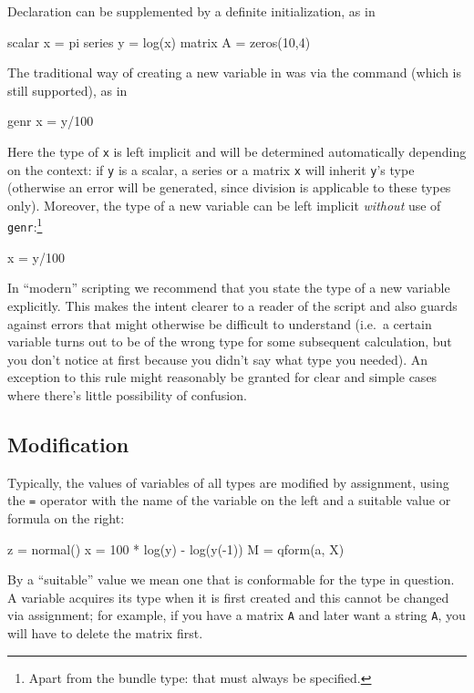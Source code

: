 Declaration can be supplemented by a definite initialization, as in

\begin{code}
scalar x = pi
series y = log(x)
matrix A = zeros(10,4)
\end{code}

The traditional way of creating a new variable in  was via
the  command (which is still supported), as in

\begin{code}
genr x = y/100
\end{code}

Here the type of \texttt{x} is left implicit and will be determined
automatically depending on the context: if \texttt{y} is a scalar, a
series or a matrix \texttt{x} will inherit \texttt{y}'s type
(otherwise an error will be generated, since division is applicable to
these types only). Moreover, the type of a new variable can be left
implicit \textit{without} use of \texttt{genr}:\footnote{Apart from
  the bundle type: that must always be specified.}

\begin{code}
x = y/100
\end{code}

In ``modern''  scripting we recommend that you state the
type of a new variable explicitly. This makes the intent clearer to a
reader of the script and also guards against errors that might
otherwise be difficult to understand (i.e.\ a certain variable turns
out to be of the wrong type for some subsequent calculation, but you
don't notice at first because you didn't say what type you needed). An
exception to this rule might reasonably be granted for clear and
simple cases where there's little possibility of confusion.

\subsection{Modification}

Typically, the values of variables of all types are modified
by assignment, using the \texttt{=} operator with the name of the
variable on the left and a suitable value or formula on the right:

\begin{code}
z = normal()
x = 100 * log(y) - log(y(-1))
M = qform(a, X)
\end{code}

By a ``suitable'' value we mean one that is conformable for the type
in question. A  variable acquires its type when it is first
created and this cannot be changed via assignment; for example, if you
have a matrix \texttt{A} and later want a string \texttt{A}, you will
have to delete the matrix first.

